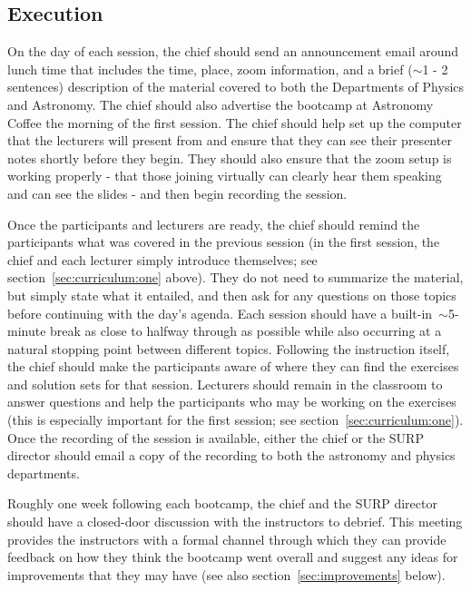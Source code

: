 \subsection{Execution}
\label{sec:timeline:execution}
\noindent
On the day of each session, the chief should send an announcement email around
lunch time that includes the time, place, zoom information, and a brief
($\sim$1 - 2 sentences) description of the material covered to both the
Departments of Physics and Astronomy.
The chief should also advertise the bootcamp at Astronomy Coffee the morning
of the first session.
The chief should help set up the computer that the lecturers will present
from and ensure that they can see their presenter notes shortly before they
begin.
They should also ensure that the zoom setup is working properly - that those
joining virtually can clearly hear them speaking and can see the slides - and
then begin recording the session.
\par
Once the participants and lecturers are ready, the chief should remind the
participants what was covered in the previous session (in the first session,
the chief and each lecturer simply introduce themselves; see
section~\ref{sec:curriculum:one} above).
They do not need to summarize the material, but simply state what it entailed,
and then ask for any questions on those topics before continuing with the day's
agenda.
Each session should have a built-in~$\sim$5-minute break as close to halfway
through as possible while also occurring at a natural stopping point between
different topics.
Following the instruction itself, the chief should make the participants aware
of where they can find the exercises and solution sets for that session.
Lecturers should remain in the classroom to answer questions and help the
participants who may be working on the exercises (this is especially important
for the first session; see section~\ref{sec:curriculum:one}).
Once the recording of the session is available, either the chief or the SURP
director should email a copy of the recording to both the astronomy and physics
departments.
\par
Roughly one week following each bootcamp, the chief and the SURP director
should have a closed-door discussion with the instructors to debrief.
This meeting provides the instructors with a formal channel through which they
can provide feedback on how they think the bootcamp went overall and suggest
any ideas for improvements that they may have (see also
section~\ref{sec:improvements} below).

